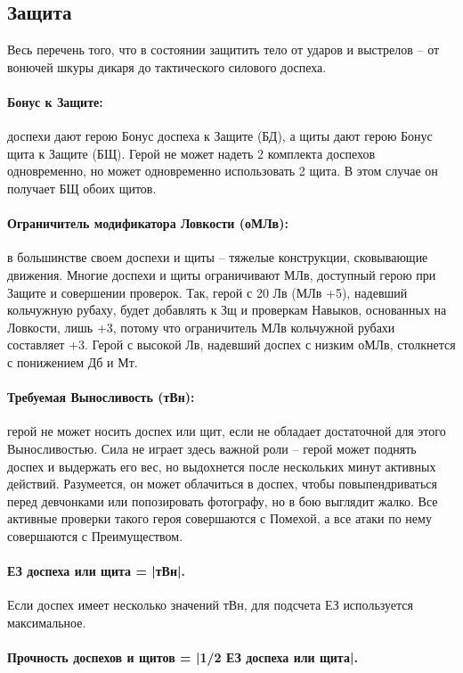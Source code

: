 \subsection{Защита}
Весь перечень того, что в состоянии защитить тело от ударов и выстрелов – от вонючей шкуры дикаря до тактического силового доспеха. 
\paragraph{Бонус к Защите:} доспехи дают герою Бонус доспеха к Защите (БД), а щиты дают герою Бонус щита к Защите (БЩ).
\newline Герой не может надеть 2 комплекта доспехов одновременно, но может одновременно использовать 2 щита. В этом случае он получает БЩ обоих щитов.
\paragraph{Ограничитель модификатора Ловкости (оМЛв):} в большинстве своем доспехи и щиты – тяжелые конструкции, сковывающие движения. Многие доспехи и щиты ограничивают МЛв, доступный герою при Защите и совершении проверок. Так, герой с 20 Лв (МЛв +5), надевший кольчужную рубаху, будет добавлять к Зщ и проверкам Навыков, основанных на Ловкости, лишь +3, потому что ограничитель МЛв кольчужной рубахи составляет +3. Герой с высокой Лв, надевший доспех с низким оМЛв, столкнется с понижением Дб и Мт.
\paragraph{Требуемая Выносливость (тВн):} герой не может носить доспех или щит, если не обладает достаточной для этого Выносливостью. Сила не играет здесь важной роли – герой может поднять доспех и выдержать его вес, но выдохнется после нескольких минут активных действий. Разумеется, он может облачиться в доспех, чтобы повыпендриваться перед девчонками или попозировать фотографу, но в бою выглядит жалко. Все активные проверки такого героя совершаются с Помехой, а все атаки по нему совершаются с Преимуществом.
\paragraph{ЕЗ доспеха или щита = |тВн|.} Если доспех имеет несколько значений тВн, для подсчета ЕЗ используется максимальное.	
\paragraph{Прочность доспехов и щитов = |1/2 ЕЗ доспеха или щита|.} 
